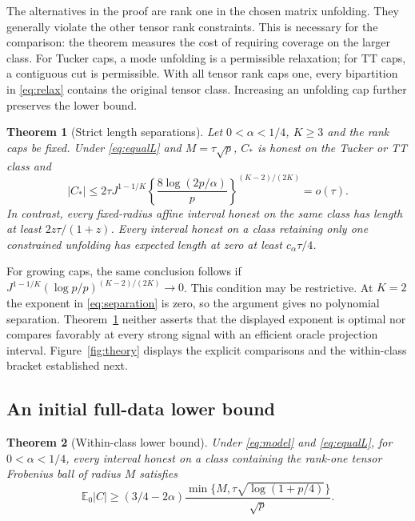\documentclass[11pt]{article}
\newtheorem{theorem}{Theorem}
\theoremstyle{remark}
\newcommand{\E}{\mathbb E}
\begin{document}
The alternatives in the proof are rank one in the chosen matrix unfolding. They generally violate the other tensor rank constraints. This is necessary for the comparison: the theorem measures the cost of requiring coverage on the larger class. For Tucker caps, a mode unfolding is a permissible relaxation; for TT caps, a contiguous cut is permissible. With all tensor rank caps one, every bipartition in \eqref{eq:relax} contains the original tensor class. Increasing an unfolding cap further preserves the lower bound.

\begin{theorem}[Strict length separations]\label{thm:separation}
Let $0<\alpha<1/4$, $K\ge3$ and the rank caps be fixed. Under \eqref{eq:equalL} and $M=\tau\sqrt p$, $C_*$ is honest on the Tucker or TT class and
\begin{equation}\label{eq:separation}
 |C_*|\le2\tau J^{1-1/K}
 \left\{\frac{8\log(2p/\alpha)}p\right\}^{(K-2)/(2K)}=o(\tau).
\end{equation}
In contrast, every fixed-radius affine interval honest on the same class has length at least $2z\tau/(1+z)$. Every interval honest on a class retaining only one constrained unfolding has expected length at zero at least $c_\alpha\tau/4$.
\end{theorem}

For growing caps, the same conclusion follows if $J^{1-1/K}(\log p/p)^{(K-2)/(2K)}\to0$. This condition may be restrictive. At $K=2$ the exponent in \eqref{eq:separation} is zero, so the argument gives no polynomial separation. Theorem~\ref{thm:separation} neither asserts that the displayed exponent is optimal nor compares favorably at every strong signal with an efficient oracle projection interval. Figure~\ref{fig:theory} displays the explicit comparisons and the within-class bracket established next.

\subsection{An initial full-data lower bound}\label{sec:gap}

\begin{theorem}[Within-class lower bound]\label{thm:jointlower}
Under \eqref{eq:model} and \eqref{eq:equalL}, for $0<\alpha<1/4$, every interval honest on a class containing the rank-one tensor Frobenius ball of radius $M$ satisfies
\begin{equation}\label{eq:jointlower}
 \E_0|C|\ge(3/4-2\alpha)
 \frac{\min\{M,\tau\sqrt{\log(1+p/4)}\}}{\sqrt p}.
\end{equation}
\end{theorem}
\end{document}

